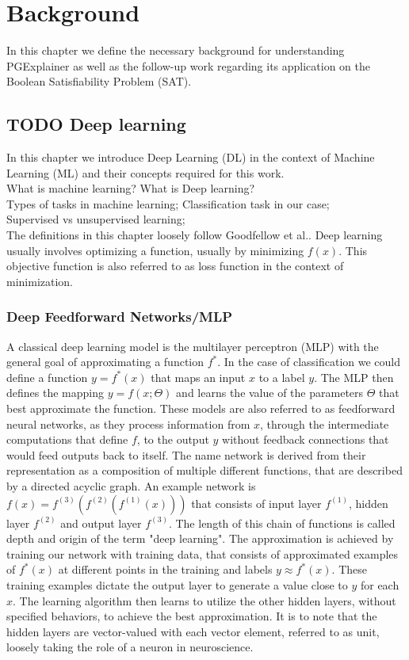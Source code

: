 \chapter{Background}
\label{ch:Background}
In this chapter we define the necessary background for understanding PGExplainer as well as the follow-up work regarding its application on the Boolean Satisfiability Problem (SAT).

\section{TODO Deep learning}
In this chapter we introduce Deep Learning (DL) in the context of Machine Learning (ML) and their concepts required for this work. \\
What is machine learning? What is Deep learning? \\
Types of tasks in machine learning; Classification task in our case; \\
Supervised vs unsupervised learning; \\
The definitions in this chapter loosely follow Goodfellow et al.\cite{Goodfellow-et-al-2016}. Deep learning usually involves optimizing a function, usually by minimizing $f(x)$. This objective function is also referred to as loss function in the context of minimization. %

\subsection{Deep Feedforward Networks/MLP}
A classical deep learning model is the multilayer perceptron (MLP) with the general goal of approximating a function $f^*$. In the case of classification we could define a function $y = f^*(x)$ that maps an input $x$ to a label $y$. The MLP then defines the mapping $y = f(x;\Theta)$ and learns the value of the parameters $\Theta$ that best approximate the function. These models are also referred to as feedforward neural networks, as they process information from $x$, through the intermediate computations that define $f$, to the output $y$ without feedback connections that would feed outputs back to itself. The name network is derived from their representation as a composition of multiple different functions, that are described by a directed acyclic graph. An example network is $f(x) = f^{(3)}(f^{(2)}(f^{(1)}(x)))$ that consists of input layer $f^{(1)}$, hidden layer $f^{(2)}$ and output layer $f^{(3)}$. The length of this chain of functions is called depth and origin of the term "deep learning". The approximation is achieved by training our network with training data, that consists of approximated examples of $f^*(x)$ at different points in the training and labels $y\approx f^*(x)$. These training examples dictate the output layer to generate a value close to $y$ for each $x$. The learning algorithm then learns to utilize the other hidden layers, without specified behaviors, to achieve the best approximation. It is to note that the hidden layers are vector-valued with each vector element, referred to as unit, loosely taking the role of a neuron in neuroscience. 

